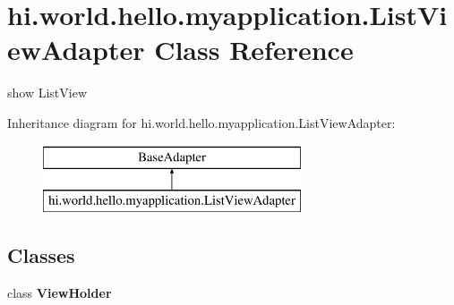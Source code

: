 \hypertarget{classhi_1_1world_1_1hello_1_1myapplication_1_1_list_view_adapter}{}\section{hi.\+world.\+hello.\+myapplication.\+List\+View\+Adapter Class Reference}
\label{classhi_1_1world_1_1hello_1_1myapplication_1_1_list_view_adapter}


show List\+View  


Inheritance diagram for hi.\+world.\+hello.\+myapplication.\+List\+View\+Adapter\+:\begin{figure}[H]
\begin{center}
\leavevmode
\includegraphics[height=2.000000cm]{classhi_1_1world_1_1hello_1_1myapplication_1_1_list_view_adapter}
\end{center}
\end{figure}
\subsection*{Classes}
\begin{DoxyCompactItemize}
\item 
class {\bfseries View\+Holder}
\end{DoxyCompactItemize}
